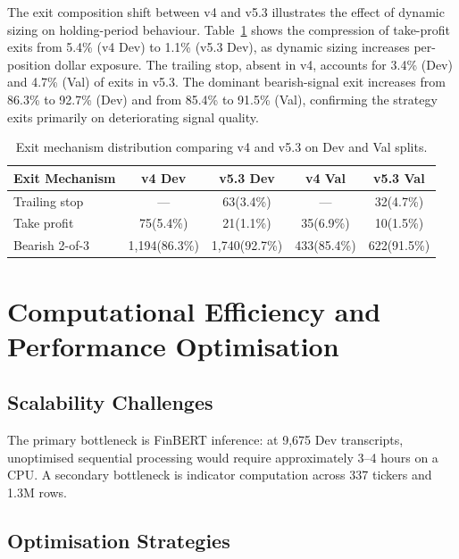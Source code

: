 \documentclass[11pt,twoside,a4paper]{article}
\begin{document}
The exit composition shift between v4 and v5.3 illustrates the effect of dynamic sizing on holding-period behaviour. Table~\ref{tab:exit-distribution} shows the compression of take-profit exits from 5.4\% (v4 Dev) to 1.1\% (v5.3 Dev), as dynamic sizing increases per-position dollar exposure. The trailing stop, absent in v4, accounts for 3.4\% (Dev) and 4.7\% (Val) of exits in v5.3. The dominant bearish-signal exit increases from 86.3\% to 92.7\% (Dev) and from 85.4\% to 91.5\% (Val), confirming the strategy exits primarily on deteriorating signal quality.

\begin{table}[H]
\centering
\caption{Exit mechanism distribution comparing v4 and v5.3 on Dev and Val splits.}
\label{tab:exit-distribution}
\begin{tabular}{lcccc}
\hline
Exit Mechanism & v4 Dev & v5.3 Dev & v4 Val & v5.3 Val \\
\hline
Trailing stop     & ---           & 63\;\;(3.4\%)  & ---           & 32\;\;(4.7\%)  \\
Take profit       & 75\;\;(5.4\%) & 21\;\;(1.1\%)  & 35\;\;(6.9\%) & 10\;\;(1.5\%)  \\
Bearish 2-of-3    & 1,194\;\;(86.3\%) & 1,740\;\;(92.7\%) & 433\;\;(85.4\%) & 622\;\;(91.5\%) \\
\hline
\end{tabular}
\end{table}

\clearpage
\section{Computational Efficiency and Performance Optimisation}

\subsection{Scalability Challenges}

The primary bottleneck is FinBERT inference: at 9,675 Dev transcripts, unoptimised sequential processing would require approximately 3--4 hours on a CPU. A secondary bottleneck is indicator computation across 337 tickers and 1.3M rows.

\subsection{Optimisation Strategies}
\end{document}
